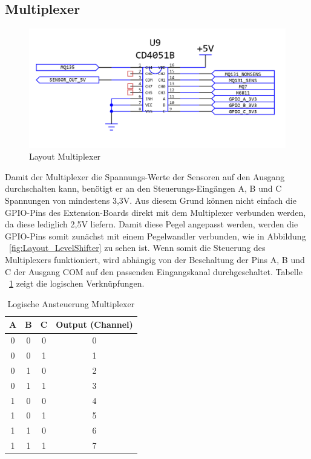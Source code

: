 \subsection{Multiplexer}\label{subsec:Multiplexer}
\begin{figure}[H]
	\includegraphics[width=\textwidth]{images/Layout_Multiplexer.png}	
	\caption{Layout Multiplexer}
	\label{fig:Layout_Multiplexer}
\end{figure}
Damit der Multiplexer die Spannungs-Werte der Sensoren auf den Ausgang durchschalten kann, benötigt er an den Steuerungs-Eingängen A, B und C Spannungen von mindestens 3,3V. Aus diesem Grund können nicht einfach die \acs{GPIO}-Pins des Extension-Boards direkt mit dem Multiplexer verbunden werden, da diese lediglich 2,5V liefern. Damit diese Pegel angepasst werden, werden die \acs{GPIO}-Pins somit zunächst mit einem Pegelwandler verbunden, wie in Abbildung ~\ref{fig:Layout_LevelShifter} zu sehen ist.
\newline
Wenn somit die Steuerung des Multiplexers funktioniert, wird abhängig von der Beschaltung der Pins A, B und C der Ausgang COM auf den passenden Eingangskanal durchgeschaltet. Tabelle ~\ref{tab:MultiplexerLogic} zeigt die logischen Verknüpfungen.
\begin{table}[H]
	\begin{center}
			\begin{tabular}{|c|c|c|c|}
				\hline
				A & B & C & Output (Channel)  \\ \hline \hline
				
				0 & 0 & 0 & 0 \\ \hline 
				0 & 0 & 1 & 1 \\ \hline 
				0 & 1 & 0 & 2 \\ \hline 
				0 & 1 & 1 & 3 \\ \hline 
				1 & 0 & 0 & 4 \\ \hline 
				1 & 0 & 1 & 5 \\ \hline 
				1 & 1 & 0 & 6 \\ \hline 
				1 & 1 & 1 & 7 \\ \hline 							
			\end{tabular}
	\end{center}
	\caption{Logische Ansteuerung Multiplexer}
	\label{tab:MultiplexerLogic}
\end{table}
